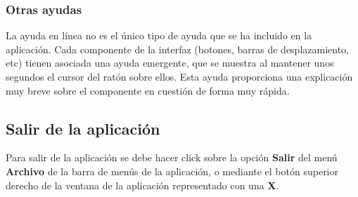 \subsubsection{Otras ayudas}
La ayuda en línea no es el único tipo de ayuda que se ha incluido en la aplicación. Cada componente de la interfaz (botones, barras de desplazamiento, etc) tienen asociada una ayuda emergente, que se muestra al mantener unos segundos el cursor del ratón sobre ellos. Esta ayuda proporciona una explicación muy breve sobre el componente en cuestión de forma muy rápida.


\subsection{Salir de la aplicación}
Para salir de la aplicación se debe hacer click sobre la opción \textbf{Salir} del menú \textbf{Archivo} de la barra de menús de la aplicación, o mediante el botón superior derecho de la ventana de la aplicación representado con una \textbf{X}.
